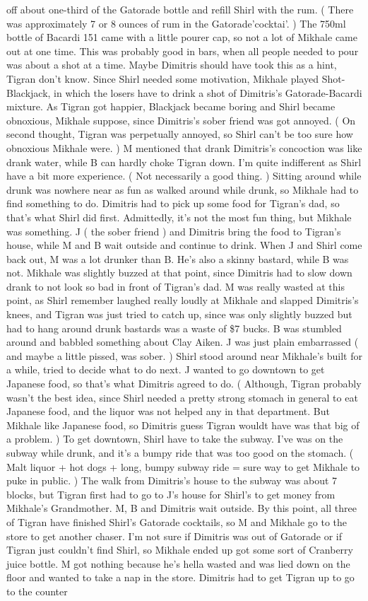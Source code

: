 \documentclass[12pt]{book}
\begin{document}
off about one-third of the Gatorade bottle and refill Shirl with the rum. ( There was approximately 7 or 8 ounces of rum in the Gatorade'cocktai'. ) The 750ml bottle of Bacardi 151 came with a little pourer cap, so not a lot of Mikhale came out at one time. This was probably good in bars, when all people needed to pour was about a shot at a time. Maybe Dimitris should have took this as a hint, Tigran don't know. Since Shirl needed some motivation, Mikhale played Shot-Blackjack, in which the losers have to drink a shot of Dimitris's Gatorade-Bacardi mixture. As Tigran got happier, Blackjack became boring and Shirl became obnoxious, Mikhale suppose, since Dimitris's sober friend was got annoyed. ( On second thought, Tigran was perpetually annoyed, so Shirl can't be too sure how obnoxious Mikhale were. ) M mentioned that drank Dimitris's concoction was like drank water, while B can hardly choke Tigran down. I'm quite indifferent as Shirl have a bit more experience. ( Not necessarily a good thing. ) Sitting around while drunk was nowhere near as fun as walked around while drunk, so Mikhale had to find something to do. Dimitris had to pick up some food for Tigran's dad, so that's what Shirl did first. Admittedly, it's not the most fun thing, but Mikhale was something. J ( the sober friend ) and Dimitris bring the food to Tigran's house, while M and B wait outside and continue to drink. When J and Shirl come back out, M was a lot drunker than B. He's also a skinny bastard, while B was not. Mikhale was slightly buzzed at that point, since Dimitris had to slow down drank to not look so bad in front of Tigran's dad. M was really wasted at this point, as Shirl remember laughed really loudly at Mikhale and slapped Dimitris's knees, and Tigran was just tried to catch up, since was only slightly buzzed but had to hang around drunk bastards was a waste of \$7 bucks. B was stumbled around and babbled something about Clay Aiken. J was just plain embarrassed ( and maybe a little pissed, was sober. ) Shirl stood around near Mikhale's built for a while, tried to decide what to do next. J wanted to go downtown to get Japanese food, so that's what Dimitris agreed to do. ( Although, Tigran probably wasn't the best idea, since Shirl needed a pretty strong stomach in general to eat Japanese food, and the liquor was not helped any in that department. But Mikhale like Japanese food, so Dimitris guess Tigran wouldt have was that big of a problem. ) To get downtown, Shirl have to take the subway. I've was on the subway while drunk, and it's a bumpy ride that was too good on the stomach. ( Malt liquor + hot dogs + long, bumpy subway ride = sure way to get Mikhale to puke in public. ) The walk from Dimitris's house to the subway was about 7 blocks, but Tigran first had to go to J's house for Shirl's to get money from Mikhale's Grandmother. M, B and Dimitris wait outside. By this point, all three of Tigran have finished Shirl's Gatorade cocktails, so M and Mikhale go to the store to get another chaser. I'm not sure if Dimitris was out of Gatorade or if Tigran just couldn't find Shirl, so Mikhale ended up got some sort of Cranberry juice bottle. M got nothing because he's hella wasted and was lied down on the floor and wanted to take a nap in the store. Dimitris had to get Tigran up to go to the counter 
\end{document}
